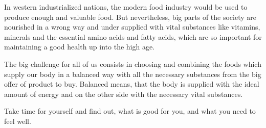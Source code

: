 \documentclass[../main.tex]{subfiles}
\begin{document}
In western industrialized nations, the modern food industry would be used to produce enough and valuable food.
But nevertheless, big parts of the society are nourished in a wrong way and under supplied with vital substances
like vitamins, minerals and the essential amino acids and fatty acids, which are so important for maintaining a good health up into the high age.

The big challenge for all of us consists in choosing and combining the foods which supply our body in a balanced way with all the necessary substances
from the big offer of product to buy.
Balanced means, that the body is supplied with the ideal amount of energy and on the other side with the necessary vital substances.

\begin{center}
\begin{fminipage}{4cm}
  Take time for yourself and find out, what is good for you, and what you need to feel well.
\end{fminipage}
\end{center}
\end{document}
